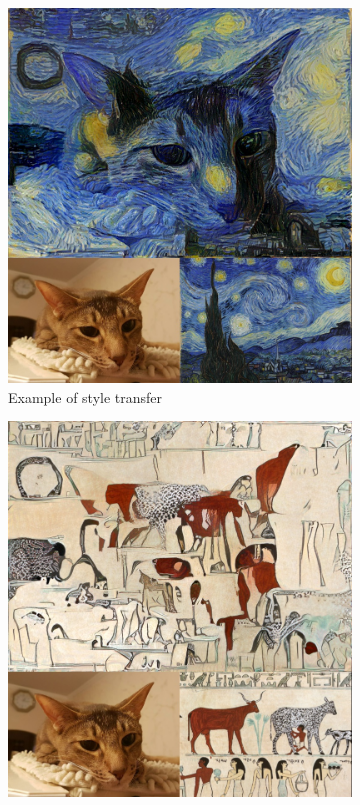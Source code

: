 \documentclass{article}
\begin{document}
\begin{figure}[H]
  \centering
  \begin{subfigure}[b]{0.45\linewidth}
    \includegraphics[width=\linewidth]{style_transfer01.jpg}
    \caption{Example of style transfer \label{fig:style_transfer_a}}
  \end{subfigure}
  \begin{subfigure}[b]{0.45\linewidth}
    \includegraphics[width=\linewidth]{style_transfer02.jpg}

\end{subfigure}
\end{figure}
\end{document}
